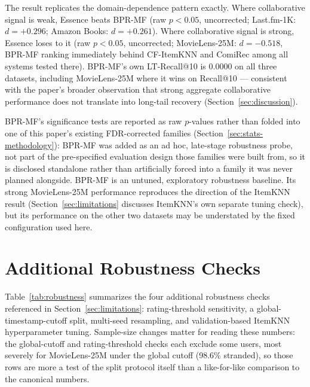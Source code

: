 \documentclass{article}
\begin{document}
The result replicates the domain-dependence pattern exactly. Where collaborative signal is weak, Essence beats BPR-MF (raw $p<0.05$, uncorrected; Last.fm-1K: $d=+0.296$; Amazon Books: $d=+0.261$). Where collaborative signal is strong, Essence loses to it (raw $p<0.05$, uncorrected; MovieLens-25M: $d=-0.518$, BPR-MF ranking immediately behind CF-ItemKNN and ComiRec among all systems tested there). BPR-MF's own LT-Recall@10 is $0.0000$ on all three datasets, including MovieLens-25M where it wins on Recall@10 --- consistent with the paper's broader observation that strong aggregate collaborative performance does not translate into long-tail recovery (Section~\ref{sec:discussion}).

BPR-MF's significance tests are reported as raw $p$-values rather than folded into one of this paper's existing FDR-corrected families (Section~\ref{sec:stats-methodology}): BPR-MF was added as an ad hoc, late-stage robustness probe, not part of the pre-specified evaluation design those families were built from, so it is disclosed standalone rather than artificially forced into a family it was never planned alongside. BPR-MF is an untuned, exploratory robustness baseline. Its strong MovieLens-25M performance reproduces the direction of the ItemKNN result (Section~\ref{sec:limitations} discusses ItemKNN's own separate tuning check), but its performance on the other two datasets may be understated by the fixed configuration used here.

\section{Additional Robustness Checks}
\label{app:robustness}

Table~\ref{tab:robustness} summarizes the four additional robustness checks referenced in Section~\ref{sec:limitations}: rating-threshold sensitivity, a global-timestamp-cutoff split, multi-seed resampling, and validation-based ItemKNN hyperparameter tuning. Sample-size changes matter for reading these numbers: the global-cutoff and rating-threshold checks each exclude some users, most severely for MovieLens-25M under the global cutoff (98.6\% stranded), so those rows are more a test of the split protocol itself than a like-for-like comparison to the canonical numbers.
\end{document}
